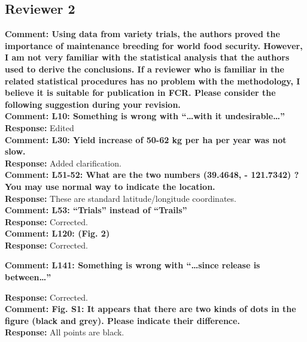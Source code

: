 \documentclass{article} \usepackage[margin=1in]{geometry}
\begin{document}
\subsection{Reviewer 2}

\textbf{Comment: Using data from variety trials, the authors proved the importance of
  maintenance breeding for world food security. However, I am not very
  familiar with the statistical analysis that the authors used to derive
  the conclusions. If a reviewer who is familiar in the related
  statistical procedures has no problem with the methodology, I believe
  it is suitable for publication in FCR. Please consider the following
  suggestion during your revision.}\\


\textbf{Comment: L10: Something is wrong with “…with it undesirable…”}\\

\textbf{Response:} Edited\\

\textbf{Comment: L30: Yield increase of 50-62 kg per ha per year was not slow.}\\

\textbf{Response:} Added clarification.\\

\textbf{Comment: L51-52: What are the two numbers (39.4648, - 121.7342) ? You may use
normal way to indicate the location.}\\

\textbf{Response:} These are standard latitude/longitude coordinates.\\

\textbf{Comment: L53: “Trials” instead of “Trails”}\\

\textbf{Response:} Corrected.\\

\textbf{Comment: L120: (Fig. 2)}\\

\textbf{Response:} Corrected.

\textbf{Comment: L141: Something is wrong with “…since release is between…”}

\textbf{Response:} Corrected.\\

\textbf{Comment: Fig. S1: It appears that there are two kinds of dots in the figure
(black and grey). Please indicate their difference.}\\

\textbf{Response:} All points are black.\\
\end{document}
